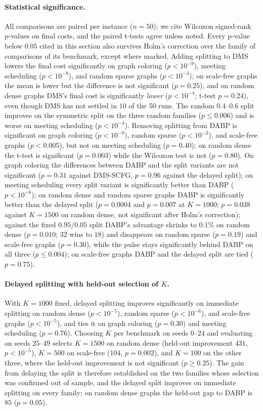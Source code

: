 \paragraph{Statistical significance.}
All comparisons are paired per instance ($n = 50$); we cite Wilcoxon
signed-rank p-values on final costs, and the paired t-tests agree unless
noted.  Every p-value below $0.05$ cited in this section also survives
Holm's correction over the family of comparisons of its benchmark, except
where marked.
Adding splitting to DMS lowers the final cost significantly on graph
coloring ($p < 10^{-9}$), meeting scheduling ($p < 10^{-8}$), and random
sparse graphs ($p < 10^{-3}$); on scale-free graphs the mean is lower but
the difference is not significant ($p = 0.25$), and on random dense graphs
DMS's final cost is significantly \emph{lower} ($p < 10^{-4}$; t-test
$p = 0.24$), even though DMS has not settled in $10$ of the $50$ runs.
The random $0.4$--$0.6$ split improves on the symmetric split on the three
random families ($p \le 0.006$) and is worse on meeting scheduling
($p < 10^{-4}$).
Removing splitting from DABP is significant on graph coloring
($p < 10^{-9}$), random sparse ($p < 10^{-3}$), and scale-free graphs
($p < 0.005$), but not on meeting scheduling ($p = 0.40$); on random dense
the t-test is significant ($p = 0.003$) while the Wilcoxon test is not
($p = 0.80$).  On graph coloring the differences between DABP and the split
variants are not significant ($p = 0.31$ against DMS-SCFG, $p = 0.96$
against the delayed split); on meeting scheduling every split variant is
significantly better than DABP ($p < 10^{-6}$); on random dense and
random sparse graphs DABP is significantly better than the delayed split
($p = 0.0004$ and $p = 0.007$ at $K=1000$; $p = 0.038$ against $K=1500$ on
random dense, not significant after Holm's correction); against the fixed $0.95/0.05$ split DABP's advantage
shrinks to $0.1\%$ on random dense ($p = 0.010$; $32$ wins to $18$) and
disappears on random sparse ($p = 0.19$) and scale-free graphs
($p = 0.30$), while the pulse stays significantly behind DABP on all
three ($p \le 0.004$); on
scale-free graphs DABP and the delayed split are tied ($p = 0.75$).
\paragraph{Delayed splitting with held-out selection of $K$.}\label{sec:heldout}
With $K=1000$ fixed, delayed splitting improves significantly on
immediate splitting on random dense ($p < 10^{-5}$), random sparse
($p < 10^{-6}$), and scale-free graphs ($p < 10^{-5}$), and ties it on
graph coloring ($p = 0.30$) and meeting scheduling ($p = 0.76$).  Choosing
$K$ per benchmark on seeds $0$--$24$ and evaluating on seeds $25$--$49$
selects $K = 1500$ on random dense (held-out improvement $431$,
$p < 10^{-5}$), $K = 500$ on scale-free ($104$, $p = 0.002$), and $K = 100$
on the other three, where the held-out improvement is not significant
($p \ge 0.25$).  The gain from delaying the split is therefore established
on the two families whose selection was confirmed out of sample, and the
delayed split improves on immediate splitting on every family; on random
dense graphs the held-out gap to DABP is $85$ ($p = 0.05$).
